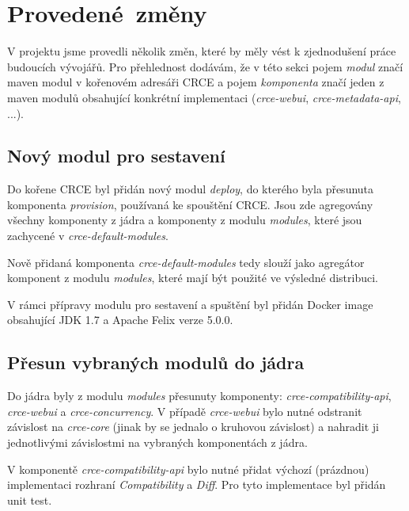 \documentclass[12pt, a4paper]{article}
\begin{document}
\section{Provedené~změny} %

V projektu jsme provedli několik změn, které by měly vést k zjednodušení práce budoucích vývojářů. Pro přehlednost dodávám, že v této sekci pojem \textit{modul} značí maven modul v kořenovém adresáři CRCE a pojem \textit{komponenta} značí jeden z maven modulů obsahující konkrétní implementaci (\textit{crce-webui}, \textit{crce-metadata-api}, ...).

\subsection{Nový modul pro sestavení}
Do kořene CRCE byl přidán nový modul \textit{deploy}, do kterého byla přesunuta komponenta \textit{provision}, používaná ke spouštění CRCE. Jsou zde agregovány všechny komponenty z jádra a komponenty z modulu \textit{modules}, které jsou zachycené v \textit{crce-default-modules}. 

Nově přidaná komponenta \textit{crce-default-modules} tedy slouží jako agregátor komponent z modulu \textit{modules}, které mají být použité ve výsledné distribuci.

V rámci přípravy modulu pro sestavení a spuštění byl přidán Docker image obsahující JDK 1.7 a Apache Felix verze 5.0.0.

\subsection{Přesun vybraných modulů do jádra}
Do jádra byly z modulu \textit{modules} přesunuty komponenty: \textit{crce-compatibility-api}, \textit{crce-webui} a \textit{crce-concurrency}. V případě \textit{crce-webui} bylo nutné odstranit závislost na \textit{crce-core} (jinak by se jednalo o kruhovou závislost) a nahradit ji jednotlivými závislostmi na vybraných komponentách z jádra.

V komponentě \textit{crce-compatibility-api} bylo nutné přidat výchozí (prázdnou) implementaci rozhraní \textit{Compatibility} a \textit{Diff}. Pro tyto implementace byl přidán unit test.
\end{document}
